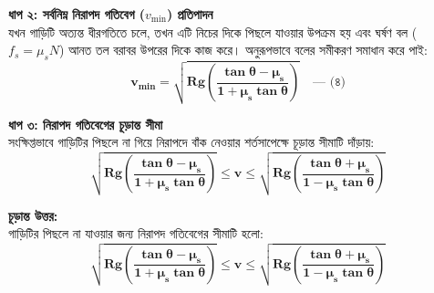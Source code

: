 \documentclass[12pt, a4paper]{article}
\begin{document}
\begin{tcolorbox}[solutionbox={সমাধান (Solution)}]
\begin{center}
\end{center}
\vspace{1em}

\noindent
\textbf{ধাপ ২: সর্বনিম্ন নিরাপদ গতিবেগ ($v_{\text{min}}$) প্রতিপাদন} \\
যখন গাড়িটি অত্যন্ত ধীরগতিতে চলে, তখন এটি নিচের দিকে পিছলে যাওয়ার উপক্রম হয় এবং ঘর্ষণ বল ($f_s = \mu_s N$) আনত তল বরাবর উপরের দিকে কাজ করে। অনুরূপভাবে বলের সমীকরণ সমাধান করে পাই:
\[ \mathbf{v_{\text{min}} = \sqrt{R g \left( \frac{\tan\theta - \mu_s}{1 + \mu_s \tan\theta} \right)}} \quad \text{--- (৪)} \]

\vspace{0.5em}
\noindent
\textbf{ধাপ ৩: নিরাপদ গতিবেগের চূড়ান্ত সীমা} \\
সংক্ষিপ্তভাবে গাড়িটির পিছলে না গিয়ে নিরাপদে বাঁক নেওয়ার শর্তসাপেক্ষে চূড়ান্ত সীমাটি দাঁড়ায়:
\[ \mathbf{\sqrt{R g \left( \frac{\tan\theta - \mu_s}{1 + \mu_s \tan\theta} \right)} \le v \le \sqrt{R g \left( \frac{\tan\theta + \mu_s}{1 - \mu_s \tan\theta} \right)}} \]

\vspace{1em}
\begin{tcolorbox}[answerbox]
\textbf{চূড়ান্ত উত্তর:} \\
গাড়িটির পিছলে না যাওয়ার জন্য নিরাপদ গতিবেগের সীমাটি হলো:
\[ \mathbf{\sqrt{R g \left( \frac{\tan\theta - \mu_s}{1 + \mu_s \tan\theta} \right)} \le v \le \sqrt{R g \left( \frac{\tan\theta + \mu_s}{1 - \mu_s \tan\theta} \right)}} \]
\end{tcolorbox}
\end{tcolorbox}
\end{document}
